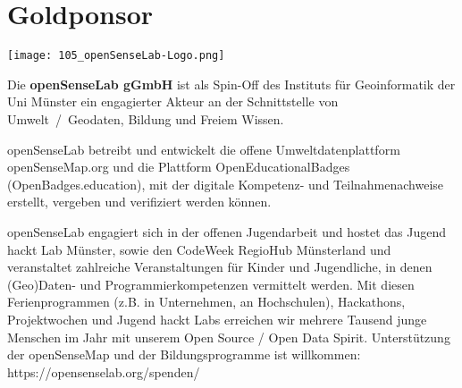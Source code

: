 \section*{Goldponsor}
\begin{flushright}
\texttt{[image: 105\_openSenseLab-Logo.png]}
\end{flushright}
\noindent
Die {\bfseries openSenseLab gGmbH} ist als Spin-Off des Instituts für Geoinformatik der Uni Münster ein engagierter Akteur an der Schnittstelle von Umwelt~/~Geodaten, Bildung und Freiem Wissen.    

\noindent
openSenseLab betreibt und entwickelt die offene Umweltdatenplattform openSenseMap.org und die Plattform OpenEducationalBadges (OpenBadges.education), mit der digitale Kompetenz- und Teilnahmenachweise erstellt, vergeben und verifiziert werden können. 

\noindent
openSenseLab engagiert sich in der offenen Jugendarbeit und hostet das Jugend hackt Lab Münster, sowie den CodeWeek RegioHub Münsterland und veranstaltet zahlreiche Veranstaltungen für Kinder und Jugendliche, in denen (Geo)Daten- und Programmierkompetenzen vermittelt werden. Mit diesen Ferienprogrammen (z.B. in Unternehmen, an Hochschulen), Hackathons, Projektwochen und Jugend hackt Labs erreichen wir mehrere Tausend junge Menschen im Jahr mit unserem Open Source / Open Data Spirit. Unterstützung der openSenseMap und der Bildungsprogramme ist willkommen: https://opensenselab.org/spenden/
